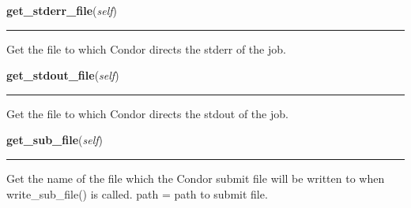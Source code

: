     \label{pipeline:CondorJob:get_stderr_file}
    \vspace{0.5ex}

    \noindent\begin{boxedminipage}{\textwidth}

    \raggedright \textbf{get\_stderr\_file}(\textit{self})

    \vspace{-1.5ex}

    \rule{\textwidth}{0.5\fboxrule}
    Get the file to which Condor directs the stderr of the job.

    \vspace{1ex}

    \end{boxedminipage}

    \label{pipeline:CondorJob:get_stdout_file}
    \vspace{0.5ex}

    \noindent\begin{boxedminipage}{\textwidth}

    \raggedright \textbf{get\_stdout\_file}(\textit{self})

    \vspace{-1.5ex}

    \rule{\textwidth}{0.5\fboxrule}
    Get the file to which Condor directs the stdout of the job.

    \vspace{1ex}

    \end{boxedminipage}

    \label{pipeline:CondorJob:get_sub_file}
    \vspace{0.5ex}

    \noindent\begin{boxedminipage}{\textwidth}

    \raggedright \textbf{get\_sub\_file}(\textit{self})

    \vspace{-1.5ex}

    \rule{\textwidth}{0.5\fboxrule}
    Get the name of the file which the Condor submit file will be written 
    to when write\_sub\_file() is called. path = path to submit file.

    \vspace{1ex}

    \end{boxedminipage}

